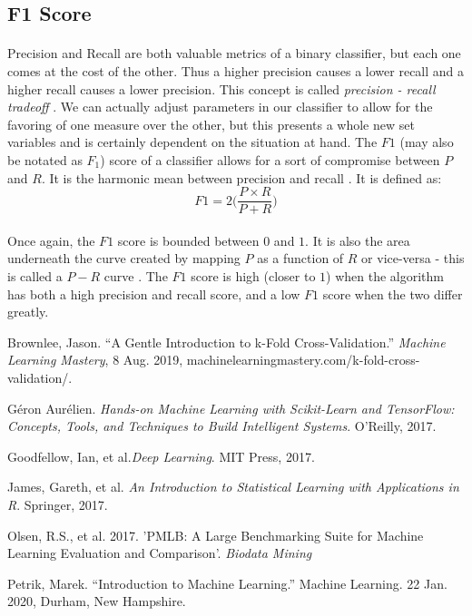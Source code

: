 \documentclass[12pt,letterpaper]{article}
\begin{document}

\subsection{F1 Score}
\paragraph*{}Precision and Recall are both valuable metrics of a binary classifier, but each one comes at the cost of the other. Thus a higher precision causes a lower recall and a higher recall causes a lower precision. This concept is called \textit{precision - recall tradeoff} \cite{Geron}. We can actually adjust parameters in our classifier to allow for the favoring of one measure over the other, but this presents a whole new set variables and is certainly dependent on the situation at hand.  The $F1$ (may also be notated as $F_1$) score of a classifier allows for a sort of compromise between $P$ and $R$. It is the harmonic mean between precision and recall \cite{Goodfellow}. It is defined as:
\begin{equation}
\label{F1 score}
F1 = 2\Big(\frac{P \times R}{P + R}\Big)
\end{equation}
\paragraph*{}Once again, the $F1$ score is bounded between $0$ and $1$. It is also the area underneath the curve created by mapping $P$ as a function of $R$ or vice-versa - this is called a $P-R$ curve \cite{Goodfellow}. The $F1$ score is high (closer to $1$) when the algorithm has both a high precision and recall score, and a low $F1$ score when the two differ greatly.




\begin{thebibliography}{9}


Brownlee, Jason. “A Gentle Introduction to k-Fold Cross-Validation.” \textit{Machine Learning Mastery}, 8 Aug. 2019, machinelearningmastery.com/k-fold-cross-validation/.

Géron Aurélien. \textit{Hands-on Machine Learning with Scikit-Learn and TensorFlow: Concepts, Tools, and Techniques to Build Intelligent Systems}. O'Reilly, 2017.

Goodfellow, Ian, et al.\textit{Deep Learning}. MIT Press, 2017.

James, Gareth, et al. \textit{An Introduction to Statistical Learning with Applications in R}. Springer, 2017.

Olsen, R.S., et al. 2017. 'PMLB: A Large Benchmarking Suite for Machine Learning Evaluation and Comparison'. \textit{Biodata Mining}

Petrik, Marek. “Introduction to Machine Learning.” Machine Learning. 22 Jan. 2020, Durham, New Hampshire.

\end{thebibliography}

\end{document}
